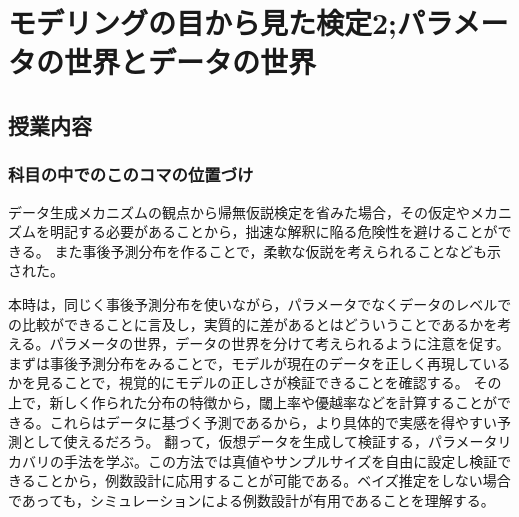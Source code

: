 \section{モデリングの目から見た検定2;パラメータの世界とデータの世界}
\label{lesson2_26}
\subsection{授業内容}
\subsubsection{科目の中でのこのコマの位置づけ}
データ生成メカニズムの観点から帰無仮説検定を省みた場合，その仮定やメカニズムを明記する必要があることから，拙速な解釈に陥る危険性を避けることができる。
また事後予測分布を作ることで，柔軟な仮説を考えられることなども示された。

本時は，同じく事後予測分布を使いながら，パラメータでなくデータのレベルでの比較ができることに言及し，実質的に差があるとはどういうことであるかを考える。パラメータの世界，データの世界を分けて考えられるように注意を促す。
まずは事後予測分布をみることで，モデルが現在のデータを正しく再現しているかを見ることで，視覚的にモデルの正しさが検証できることを確認する。
その上で，新しく作られた分布の特徴から，閾上率や優越率などを計算することができる。これらはデータに基づく予測であるから，より具体的で実感を得やすい予測として使えるだろう。
翻って，仮想データを生成して検証する，パラメータリカバリの手法を学ぶ。この方法では真値やサンプルサイズを自由に設定し検証できることから，例数設計に応用することが可能である。ベイズ推定をしない場合であっても，シミュレーションによる例数設計が有用であることを理解する。

